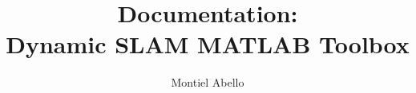 \documentclass[a4paper, twoside, 12pt]{article}
\begin{document}
\title{Documentation:\\ Dynamic SLAM MATLAB Toolbox}
\author{Montiel Abello}
\date{}  %
\maketitle













%

\end{document}
